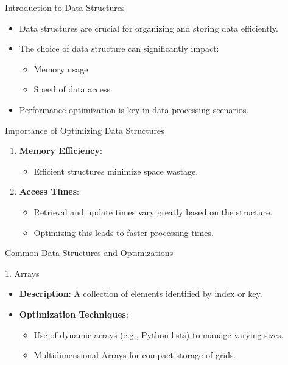 \documentclass[aspectratio=169]{beamer}
\begin{document}
\begin{frame}{Introduction to Data Structures}
  \begin{itemize}
    \item Data structures are crucial for organizing and storing data efficiently.
    \item The choice of data structure can significantly impact:
      \begin{itemize}
        \item Memory usage
        \item Speed of data access
      \end{itemize}
    \item Performance optimization is key in data processing scenarios.
  \end{itemize}
\end{frame}

\begin{frame}{Importance of Optimizing Data Structures}
  \begin{enumerate}
    \item \textbf{Memory Efficiency}: 
      \begin{itemize}
        \item Efficient structures minimize space wastage.
      \end{itemize}
    \item \textbf{Access Times}:
      \begin{itemize}
        \item Retrieval and update times vary greatly based on the structure.
        \item Optimizing this leads to faster processing times.
      \end{itemize}
  \end{enumerate}
\end{frame}

\begin{frame}[fragile]{Common Data Structures and Optimizations}
  \begin{block}{1. Arrays}
    \begin{itemize}
      \item \textbf{Description}: A collection of elements identified by index or key.
      \item \textbf{Optimization Techniques}:
        \begin{itemize}
          \item Use of dynamic arrays (e.g., Python lists) to manage varying sizes.
          \item Multidimensional Arrays for compact storage of grids.
        \end{itemize}
    \end{itemize}
  \end{block}
\end{frame}
\end{document}
